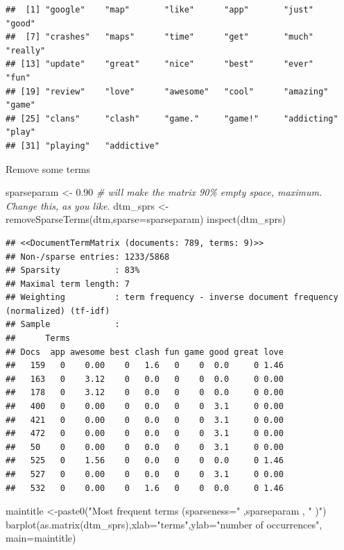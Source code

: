 \documentclass[
]{book}
\newenvironment{Shaded}{\begin{snugshade}}{\end{snugshade}}
\newcommand{\AttributeTok}[1]{\textcolor[rgb]{0.77,0.63,0.00}{#1}}
\newcommand{\CommentTok}[1]{\textcolor[rgb]{0.56,0.35,0.01}{\textit{#1}}}
\newcommand{\FloatTok}[1]{\textcolor[rgb]{0.00,0.00,0.81}{#1}}
\newcommand{\FunctionTok}[1]{\textcolor[rgb]{0.00,0.00,0.00}{#1}}
\newcommand{\NormalTok}[1]{#1}
\newcommand{\OtherTok}[1]{\textcolor[rgb]{0.56,0.35,0.01}{#1}}
\newcommand{\StringTok}[1]{\textcolor[rgb]{0.31,0.60,0.02}{#1}}
\begin{document}
\begin{verbatim}
##  [1] "google"    "map"       "like"      "app"       "just"      "good"     
##  [7] "crashes"   "maps"      "time"      "get"       "much"      "really"   
## [13] "update"    "great"     "nice"      "best"      "ever"      "fun"      
## [19] "review"    "love"      "awesome"   "cool"      "amazing"   "game"     
## [25] "clans"     "clash"     "game."     "game!"     "addicting" "play"     
## [31] "playing"   "addictive"
\end{verbatim}

Remove some terms

\begin{Shaded}
\begin{Highlighting}[]
\NormalTok{sparseparam }\OtherTok{\textless{}{-}} \FloatTok{0.90} \CommentTok{\# will make the matrix 90\% empty space, maximum. Change this, as you like.}
\NormalTok{dtm\_sprs }\OtherTok{\textless{}{-}} \FunctionTok{removeSparseTerms}\NormalTok{(dtm,}\AttributeTok{sparse=}\NormalTok{sparseparam)}
\FunctionTok{inspect}\NormalTok{(dtm\_sprs)}
\end{Highlighting}
\end{Shaded}

\begin{verbatim}
## <<DocumentTermMatrix (documents: 789, terms: 9)>>
## Non-/sparse entries: 1233/5868
## Sparsity           : 83%
## Maximal term length: 7
## Weighting          : term frequency - inverse document frequency (normalized) (tf-idf)
## Sample             :
##      Terms
## Docs  app awesome best clash fun game good great love
##   159   0    0.00    0   1.6   0    0  0.0     0 1.46
##   163   0    3.12    0   0.0   0    0  0.0     0 0.00
##   178   0    3.12    0   0.0   0    0  0.0     0 0.00
##   400   0    0.00    0   0.0   0    0  3.1     0 0.00
##   421   0    0.00    0   0.0   0    0  3.1     0 0.00
##   472   0    0.00    0   0.0   0    0  3.1     0 0.00
##   50    0    0.00    0   0.0   0    0  3.1     0 0.00
##   525   0    1.56    0   0.0   0    0  0.0     0 1.46
##   527   0    0.00    0   0.0   0    0  3.1     0 0.00
##   532   0    0.00    0   1.6   0    0  0.0     0 1.46
\end{verbatim}

\begin{Shaded}
\begin{Highlighting}[]
\NormalTok{maintitle }\OtherTok{\textless{}{-}}\FunctionTok{paste0}\NormalTok{(}\StringTok{"Most frequent terms (sparseness="}\NormalTok{ ,sparseparam , }\StringTok{"  )"}\NormalTok{)}
\FunctionTok{barplot}\NormalTok{(}\FunctionTok{as.matrix}\NormalTok{(dtm\_sprs),}\AttributeTok{xlab=}\StringTok{"terms"}\NormalTok{,}\AttributeTok{ylab=}\StringTok{"number of occurrences"}\NormalTok{, }\AttributeTok{main=}\NormalTok{maintitle)}
\end{Highlighting}
\end{Shaded}
\end{document}
